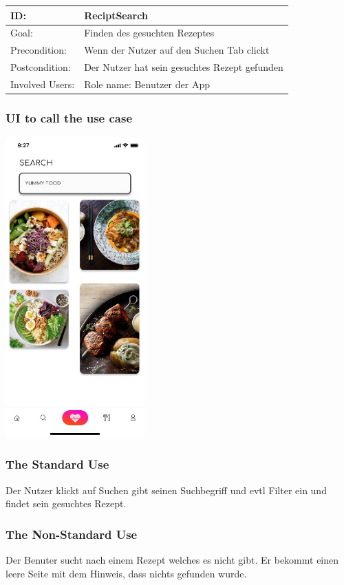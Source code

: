 \documentclass[12pt]{article}
\theoremstyle{definition}
\begin{document}
\begin{tabular}{|p{.2\linewidth}|p{.65\linewidth}|}
\hline 
ID: & ReciptSearch \\ \hline
Goal: & Finden des gesuchten Rezeptes \\ \hline
Precondition: & Wenn der Nutzer auf den Suchen Tab clickt \\ \hline
Postcondition: & Der Nutzer hat sein gesuchtes Rezept gefunden \\ \hline
Involved Users: &Role name: Benutzer der App \\ \hline
\end{tabular}

\subsubsection{UI to call the use case}

\begin{center}
    \includegraphics[width=0.4\textwidth]{res/images/Search.jpeg}
\end{center}


\subsubsection{The Standard Use}
Der Nutzer klickt auf Suchen gibt seinen Suchbegriff und evtl Filter ein und findet sein gesuchtes Rezept.


\subsubsection{The Non-Standard Use}
Der Benuter sucht nach einem Rezept welches es nicht gibt. Er bekommt einen leere Seite mit dem Hinweis, dass nichts gefunden wurde.
\pagebreak
\end{document}

